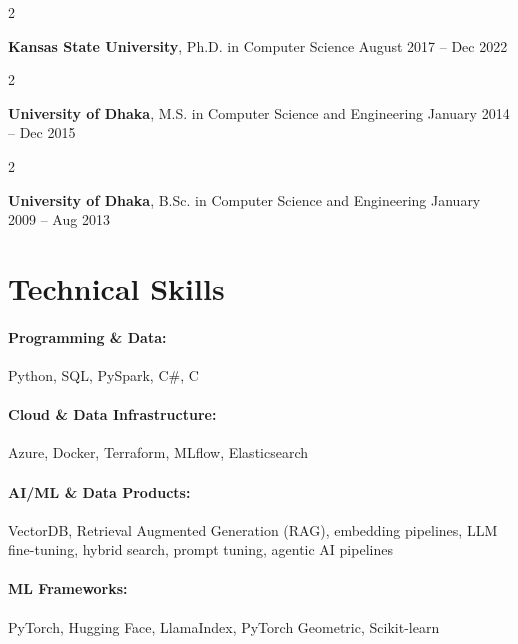 \documentclass[10pt, letterpaper]{article}
\newenvironment{twocolentry}[2][]{
    \onecolentry
    \def\secondColumn{#2}
    \setcolumnwidth{\fill, 4.5 cm}
    \begin{paracol}{2}
}{
    \switchcolumn \raggedleft \secondColumn
    \end{paracol}
    \endonecolentry
} %
\begin{document}
        \begin{twocolentry}{
            August 2017 -- Dec 2022
        }
            \textbf{Kansas State University}, Ph.D. in Computer Science\end{twocolentry}

        \begin{twocolentry}{
            January 2014 -- Dec 2015
        }
            \textbf{University of Dhaka}, M.S. in Computer Science and Engineering\end{twocolentry}

        \begin{twocolentry}{
            January 2009 -- Aug 2013
        }
            \textbf{University of Dhaka}, B.Sc. in Computer Science and Engineering\end{twocolentry}

\vspace{-1mm}
\section{Technical Skills}

        \paragraph{Programming \& Data:} Python, SQL, PySpark, C\#, C
        \vspace{-4mm}
        \paragraph{Cloud \& Data Infrastructure:} Azure, Docker, Terraform, MLflow, Elasticsearch
        \vspace{-4mm}
        \paragraph{AI/ML \& Data Products:} VectorDB, Retrieval Augmented Generation (RAG), embedding pipelines, LLM fine-tuning, hybrid search, prompt tuning, agentic AI pipelines
        \vspace{-4mm}
        \paragraph{ML Frameworks:} PyTorch, Hugging Face, LlamaIndex, PyTorch Geometric, Scikit-learn
\end{document}
